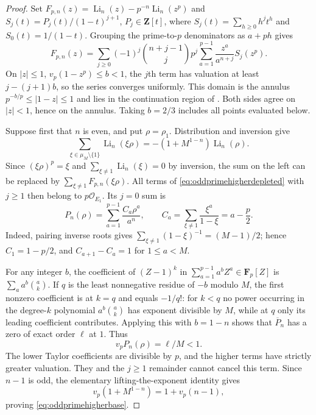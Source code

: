 \documentclass[11pt,a4paper]{article}
\theoremstyle{remark}
\newcommand{\Z}{\mathbf Z}
\newcommand{\F}{\mathbf F}
\begin{document}
\begin{proof}
Set $F_{p,n}(z)=\operatorname{Li}_n(z)-p^{-n}
\operatorname{Li}_n(z^p)$ and
$S_j(t)=P_j(t)/(1-t)^{j+1}$, $P_j\in\Z[t]$, where
$S_j(t)=\sum_{h\geq0}h^jt^h$ and $S_0(t)=1/(1-t)$.
Grouping the prime-to-$p$ denominators as $a+ph$ gives
\begin{equation}\label{eq:oddprimehigherdepleted}
 F_{p,n}(z)=\sum_{j\geq0}(-1)^j\binom{n+j-1}{j}p^j
       \sum_{a=1}^{p-1}\frac{z^a}{a^{n+j}}S_j(z^p).
\end{equation}
On $|z|\leq1$, $v_p(1-z^p)\leq b<1$, the $j$th term has
valuation at least $j-(j+1)b$, so the series converges uniformly.
This domain is the annulus
$p^{-b/p}\leq|1-z|\leq1$ and lies in the continuation region
of \cite[Theorem~2.7(3)]{BesserDeJeuAlgorithm}.
Both sides agree on $|z|<1$, hence on the annulus. Taking
$b=2/3$ includes all points evaluated below.

Suppose first that $n$ is even, and put $\rho=\rho_1$.
Distribution and inversion
\cite[Proposition~2.10]{BesserDeJeuAlgorithm} give
\[
 \sum_{\xi\in\mu_M\setminus\{1\}}\operatorname{Li}_n(\xi\rho)
       =-(1+M^{1-n})\operatorname{Li}_n(\rho).
\]
Since $(\xi\rho)^p=\xi$ and
$\sum_{\xi\ne1}\operatorname{Li}_n(\xi)=0$ by inversion,
the sum on the left can be replaced by
$\sum_{\xi\ne1}F_{p,n}(\xi\rho)$.
All terms of \eqref{eq:oddprimehigherdepleted} with $j\geq1$
then belong to $p\mathcal O_{E_1}$. Its $j=0$ sum is
\[
 P_n(\rho)=\sum_{a=1}^{p-1}\frac{C_a\rho^a}{a^n},\qquad
 C_a=\sum_{\xi\ne1}\frac{\xi^a}{1-\xi}=a-\frac p2.
\]
Indeed, pairing inverse roots gives
$\sum_{\xi\ne1}(1-\xi)^{-1}=(M-1)/2$; hence
$C_1=1-p/2$, and $C_{a+1}-C_a=1$ for $1\leq a<M$.

For any integer $b$, the coefficient of $(Z-1)^k$ in
$\sum_{a=1}^{p-1}a^bZ^a\in\F_p[Z]$ is
$\sum_a a^b\binom ak$.
If $q$ is the least nonnegative residue of $-b$ modulo $M$,
the first nonzero coefficient is at $k=q$ and equals $-1/q!$:
for $k<q$ no power occurring in the degree-$k$ polynomial
$a^b\binom ak$ has exponent divisible by $M$, while at $q$
only its leading coefficient contributes.
Applying this with $b=1-n$ shows that $\overline P_n$
has a zero of exact order $\ell$ at $1$. Thus
\[
 v_pP_n(\rho)=\ell/M<1.
\]
The lower Taylor coefficients are divisible by $p$, and the
higher terms have strictly greater valuation. They and the
$j\geq1$ remainder cannot cancel this term.
Since $n-1$ is odd, the elementary lifting-the-exponent identity gives
\[
 v_p(1+M^{1-n})=1+v_p(n-1),
\]
proving \eqref{eq:oddprimehigherbase}.


\end{proof}
\end{document}
